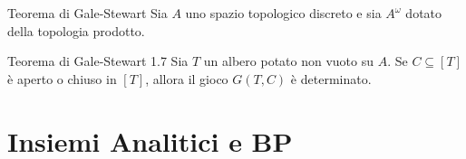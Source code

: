 \documentclass[babel]{beamer}
\renewcommand{\href}[2]{#2}
\begin{document}
\begin{frame}[label={sec:org2ef3855}]{Teorema di Gale-Stewart}
Sia \(A\) uno \href{../../../../../../../org/roam/20250103145124-topologia.org}{spazio topologico} \href{../../../../../../../org/roam/20250317165247-topologia_discreta.org}{discreto} e sia \(A^{\omega}\) dotato della \href{../../../../../../../org/roam/20250109154723-topologia_prodotto.org}{topologia prodotto}.
\begin{alertblock}{Teorema di Gale-Stewart 1.7}
Sia \(T\) un \href{../../../../../../../org/roam/20250514142154-albero_teoria_descrittiva_degli_insiemi.org}{albero} \href{../../../../../../../org/roam/20250514142208-albero_potato.org}{potato} non vuoto su \(A\). Se \(C \subseteq [T]\) è \href{../../../../../../../org/roam/20250103145124-topologia.org}{aperto} o \href{../../../../../../../org/roam/20250103145124-topologia.org}{chiuso} in \([T]\), allora \href{../../../../../../../org/roam/20250513171520-giochi_di_gale_stewart.org}{il gioco} \(G(T,C)\) è \href{../../../../../../../org/roam/20250513155732-logic_game.org}{determinato}.
\end{alertblock}
\end{frame}
\section{Insiemi Analitici e BP}
\label{sec:org4888705}
\end{document}
